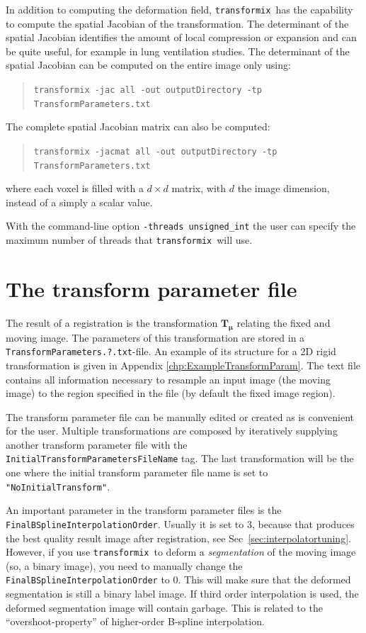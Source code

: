 \documentclass[]{report}
\newcommand{\transformix}{\texttt{transformix}}
\newcommand{\vmu}{\bm{\mu}}
\newcommand{\vTm}{\bm{T}_{\vmu}}
\begin{document}
In addition to computing the deformation field, \transformix\ has
the capability to compute the spatial Jacobian of the
transformation. The determinant of the spatial Jacobian identifies
the amount of local compression or expansion and can be quite
useful, for example in lung ventilation studies. The determinant of
the spatial Jacobian can be computed on the entire image only using:
\begin{quote}
\texttt{transformix -jac all -out outputDirectory -tp
TransformParameters.txt}
\end{quote}
The complete spatial Jacobian matrix can also be computed:
\begin{quote}
\texttt{transformix -jacmat all -out outputDirectory -tp
TransformParameters.txt}
\end{quote}
where each voxel is filled with a $d \times d$ matrix, with $d$ the
image dimension, instead of a simply a scalar value.

With the command-line option \texttt{-threads unsigned\_int} the
user can specify the maximum number of threads that \transformix\
will use.

\section{The transform parameter file}\label{sec:transformix:tp}

The result of a registration is the transformation $\vTm$ relating
the fixed and moving image. The parameters of this transformation
are stored in a \texttt{TransformParameters.?.txt}-file. An
example of its structure for a 2D rigid transformation is given in
Appendix \ref{chp:ExampleTransformParam}. The text file contains
all information necessary to resample an input image (the moving
image) to the region specified in the file (by default the fixed
image region).

The transform parameter file can be manually edited or created as
is convenient for the user. Multiple transformations are composed
by iteratively supplying another transform parameter file with the
\texttt{InitialTransformParametersFileName} tag. The last
transformation will be the one where the initial transform
parameter file name is set to \texttt{"NoInitialTransform"}.

An important parameter in the transform parameter files is the
\texttt{FinalBSplineInterpolationOrder}. Usually it is set to 3, because that
produces the best quality result image after registration, see
Sec~\ref{sec:interpolatortuning}. However, if you use \transformix\ to deform a
\emph{segmentation} of the moving image (so, a binary image), you need to
manually change the \texttt{FinalBSplineInterpolationOrder} to 0. This will
make sure that the deformed segmentation is still a binary label image. If
third order interpolation is used, the deformed segmentation image will contain
garbage. This is related to the ``overshoot-property'' of higher-order B-spline
interpolation.
\end{document}
